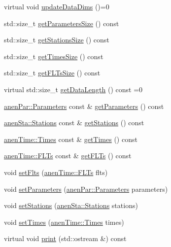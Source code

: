 \begin{DoxyCompactItemize}
\item 
virtual void \mbox{\hyperlink{class_forecasts_a8c7d29af8edb5c3bc6a6aad2220506a9}{update\+Data\+Dims}} ()=0
\item 
std\+::size\+\_\+t \mbox{\hyperlink{class_forecasts_a317a7d7bd37c3939a187413180201214}{get\+Parameters\+Size}} () const
\item 
std\+::size\+\_\+t \mbox{\hyperlink{class_forecasts_af875cdef20964f44eb07579d064ac32b}{get\+Stations\+Size}} () const
\item 
std\+::size\+\_\+t \mbox{\hyperlink{class_forecasts_a8436043f928220ba29efd4c7d7c0c8a4}{get\+Times\+Size}} () const
\item 
std\+::size\+\_\+t \mbox{\hyperlink{class_forecasts_a3e54c52233da87a7868a95e83b7e5ff7}{get\+F\+L\+Ts\+Size}} () const
\item 
virtual std\+::size\+\_\+t \mbox{\hyperlink{class_forecasts_aeafd542ddff2fc678440d555002dc912}{get\+Data\+Length}} () const =0
\item 
\mbox{\hyperlink{classanen_par_1_1_parameters}{anen\+Par\+::\+Parameters}} const  \& \mbox{\hyperlink{class_forecasts_a08adfc1510d1a2a506390276dcad8e09}{get\+Parameters}} () const
\item 
\mbox{\hyperlink{classanen_sta_1_1_stations}{anen\+Sta\+::\+Stations}} const  \& \mbox{\hyperlink{class_forecasts_a31978316404dedda6ae3860d7844d855}{get\+Stations}} () const
\item 
\mbox{\hyperlink{classanen_time_1_1_times}{anen\+Time\+::\+Times}} const  \& \mbox{\hyperlink{class_forecasts_ac256fce5eb5e6e773f7f8579bf10c7d7}{get\+Times}} () const
\item 
\mbox{\hyperlink{classanen_time_1_1_f_l_ts}{anen\+Time\+::\+F\+L\+Ts}} const  \& \mbox{\hyperlink{class_forecasts_a3762d8a919986b5874291dfc528303a1}{get\+F\+L\+Ts}} () const
\item 
void \mbox{\hyperlink{class_forecasts_aa15a4e56c5747afc1594131ad30e4fc3}{set\+Flts}} (\mbox{\hyperlink{classanen_time_1_1_f_l_ts}{anen\+Time\+::\+F\+L\+Ts}} flts)
\item 
void \mbox{\hyperlink{class_forecasts_a8dd1f257833a71c72deb3e8d595d607e}{set\+Parameters}} (\mbox{\hyperlink{classanen_par_1_1_parameters}{anen\+Par\+::\+Parameters}} parameters)
\item 
void \mbox{\hyperlink{class_forecasts_aeb1ca08f01a0ff5145607f8e962fb750}{set\+Stations}} (\mbox{\hyperlink{classanen_sta_1_1_stations}{anen\+Sta\+::\+Stations}} stations)
\item 
void \mbox{\hyperlink{class_forecasts_a85263c55dda71ef3363afbd2be337eed}{set\+Times}} (\mbox{\hyperlink{classanen_time_1_1_times}{anen\+Time\+::\+Times}} times)
\item 
virtual void \mbox{\hyperlink{class_forecasts_addb1f75f0dc6833c466453c51256812c}{print}} (std\+::ostream \&) const
\end{DoxyCompactItemize}
